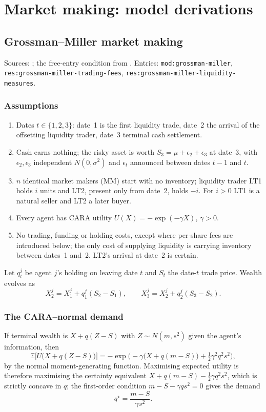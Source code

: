 \documentclass[a4paper,oneside,openany]{book}
\begin{document}
\chapter*{Market making: model derivations}

\section*{Grossman--Miller market making}

Sources: \citep[chap.~``A Primer on the Microstructure of Financial Markets'', pp.~21--27]{crypto-cartea}; the free-entry condition from \citep[eqs.~(16)--(19), printed pp.~18--19]{grossman-miller-1988-nber}. Entries: \texttt{mod:grossman-miller}, \texttt{res:grossman-miller-trading-fees}, \texttt{res:grossman-miller-liquidity-measures}.

\subsection*{Assumptions}
\begin{enumerate}[label=\roman*.]
\setlength{\itemsep}{0pt}
\item Dates $t\in\{1,2,3\}$: date~1 is the first liquidity trade, date~2 the arrival of the offsetting liquidity trader, date~3 terminal cash settlement.
\item Cash earns nothing; the risky asset is worth $S_3=\mu+\epsilon_2+\epsilon_3$ at date~3, with $\epsilon_2,\epsilon_3$ independent $N(0,\sigma^2)$ and $\epsilon_t$ announced between dates $t-1$ and $t$.
\item $n$ identical market makers (MM) start with no inventory; liquidity trader LT1 holds $i$ units and LT2, present only from date~2, holds $-i$. For $i>0$ LT1 is a natural seller and LT2 a later buyer.
\item Every agent has CARA utility $U(X)=-\exp(-\gamma X)$, $\gamma>0$.
\item No trading, funding or holding costs, except where per-share fees are introduced below; the only cost of supplying liquidity is carrying inventory between dates~1 and~2. LT2's arrival at date~2 is certain.
\end{enumerate}
Let $q_t^j$ be agent $j$'s holding on leaving date $t$ and $S_t$ the date-$t$ trade price. Wealth evolves as
\[ X_2^j=X_1^j+q_1^j(S_2-S_1), \qquad X_3^j=X_2^j+q_2^j(S_3-S_2). \]

\subsection*{The CARA--normal demand}
If terminal wealth is $X+q(Z-S)$ with $Z\sim N(m,s^2)$ given the agent's information, then
\[ \mathbb{E}\big[U\big(X+q(Z-S)\big)\big]=-\exp\Big(-\gamma\big(X+q(m-S)\big)+\tfrac12\gamma^2q^2s^2\Big), \]
by the normal moment-generating function. Maximising expected utility is therefore maximising the certainty equivalent $X+q(m-S)-\tfrac12\gamma q^2s^2$, which is strictly concave in $q$; the first-order condition $m-S-\gamma qs^2=0$ gives the demand
\[ q^\star=\frac{m-S}{\gamma s^2}. \]
\end{document}
